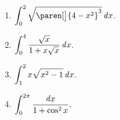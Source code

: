 \documentclass[a4paper,punct=CCT]{ctexbook}
\theoremstyle{break}
\newif\ifshowsol
\begin{document}
\begin{enumerate}
\item \(\displaystyle \int_0^2 \sqrt{\paren[\big]{4-x^2}^3} \dx\).

  \ifshowsol
  用\(x = 2 \sin t\)做换元, 有
  \[
    \begin{split}
      \int_0^{\pi/2} \sqrt{\paren[\big]{4-x^2}^3} \dx
      &= 16 \int_0^{\pi/2} \cos^4 t \dt
      = 4 \int_0^{\pi/2} \paren[\big]{1 + \cos 2t}^2 \dt \\
      &= 4 \int_0^{\pi/2} \paren{1 + 2 \cos 2t + \cos^2 2t} \dt \\
      &= 4 \paren[\bigg]{\frac{\pi}{2} + \sin 2t \Big\vert_0^{\pi/2} + \frac12 \int_0^\pi \cos^2 u \du} \\
      &= 2 \pi + \int_0^\pi \paren{1 + \cos 2u} \du \\
      &= 2 \pi + \pi + \frac{\sin 2u}{2} \bigg\vert_0^\pi
      = 3 \pi.
    \end{split}
  \]
  \fi
\item \(\displaystyle \int_0^4 \frac{\sqrt x}{1 + x \sqrt{x}} \mathop{}\!\mathit{d} x\).

  \ifshowsol
  用\(t = \sqrt x\)做换元, 有
  \[
    \begin{split}
      \int_0^4 \frac{\sqrt x}{1 + x \sqrt{x}} \dx
      = \int_0^2 \frac{t}{1+t^3} \cdot 2t \dt
      = \frac23 \int_0^2 \frac{\diff(t^3)}{1+t^3}
      = \frac23 \ln(1+t^3) \Big\vert_0^2
      = \frac23 \ln9
      = \frac43 \ln3.
    \end{split}
  \]
  \fi

\item \(\displaystyle \int_1^2 x \sqrt{x^2 - 1} \mathop{}\!\mathit{d} x\).

  \ifshowsol
  用\(x = \cosh t\)做换元, 有
  \[
    \int_1^2 x \sqrt{x^2 - 1} \dx
    = \int_0^{\arccosh2} \sinh^2 t \cosh t \dt
    = \int_0^{\sinh\arccosh2} u^2 \du
    = \frac{u^3}{3} \bigg\vert_0^{\sqrt3}
    = \sqrt3.
  \]
  其中
  \[
    \sinh\arccosh2 = \sqrt{\cosh^2 \arccosh 2 - 1} = \sqrt{2^2 - 1} = \sqrt3.
  \]
  或者用\(x = \sec t\)做换元, 有
  \[
    \int_1^2 x \sqrt{x^2 - 1} \dx
    = \int_0^{\pi/3} \tan^2 t \sec^2 t \dt
    = \int_0^{\sqrt3} u^2 \du
    = \frac{u^3}{3} \bigg\vert_0^{\sqrt3}
    = \sqrt3.
  \]
  \fi

\item \(\displaystyle \int_0^{2\pi} \frac{\mathop{}\!\mathit{d} x}{1 + \cos^2 x}\).

  \ifshowsol
  先将被积函数降次, 然后把积分上下限变换到最小的范围, 最后用\(t = \tan \frac x2\)做换元, 有
  \[
    \begin{split}
      \int_0^{2\pi} \frac{\dx}{1 + \cos^2 x}
      &= \int_0^{2\pi} \frac{2}{3 + \cos 2x} \dx
      = \int_0^{4\pi} \frac{\dx}{3 + \cos x}
      = 2 \int_0^{2\pi} \frac{\dx}{3 + \cos x} \\
      &= 2 \int_{-\pi}^{\pi} \frac{\dx}{3 - \cos x}
      = 4 \int_0^{\pi} \frac{\dx}{3 - \cos x} \\
      &= 4 \int_0^{+\infty} \frac{1}{3 - \paren{1-t^2}/\paren{1+t^2}} \frac{2}{1+t^2} \dt
      = 4 \int_0^{+\infty} \frac{\dt}{1 + 2t^2} \\
      &= \frac{4}{\sqrt2} \arctan \sqrt2 t \bigg\vert_0^{+\infty}
      = \sqrt2 \pi.
    \end{split}
  \]
  \fi


\end{enumerate}
\end{document}
